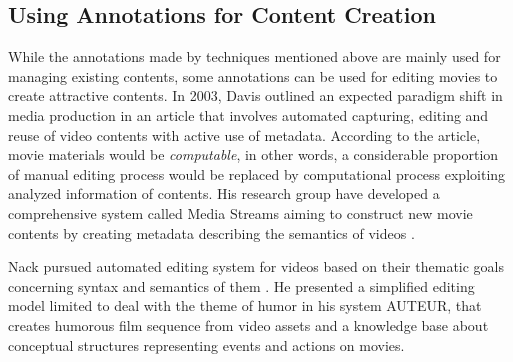 \subsection{Using Annotations for Content Creation}
While the annotations made by techniques mentioned above are mainly used for managing existing contents, some annotations can be used for editing movies to create attractive contents.
In 2003, Davis outlined an expected paradigm shift in media production in an article \cite{davis2003editing} that involves automated capturing, editing and reuse of video contents with active use of metadata.
According to the article, movie materials would be {\it computable}, in other words, a considerable proportion of manual editing process would be replaced by computational process exploiting analyzed information of contents.
His research group have developed a comprehensive system called Media Streams aiming to construct new movie contents by creating metadata describing the semantics of videos \cite{davis2000media}.

Nack pursued automated editing system for videos based on their thematic goals concerning syntax and semantics of them \cite{nack1997application}.
He presented a simplified editing model limited to deal with the theme of humor in his system AUTEUR, that creates humorous film sequence from video assets and a knowledge base about conceptual structures representing events and actions on movies.
